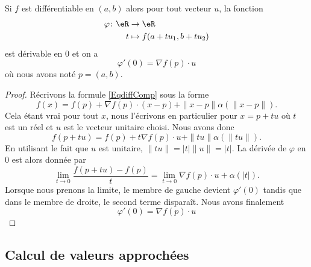 \begin{proposition}
    Si $f$ est différentiable en $(a,b)$ alors pour tout vecteur \( u\), la fonction
    \begin{equation}
        \begin{aligned}
            \varphi\colon \eR&\to \eR \\
            t&\mapsto   f(a+tu_1,b+tu_2)
        \end{aligned}
    \end{equation}
    est dérivable en $0$ et on a
    \begin{equation}
        \varphi'(0)=\nabla f(p)\cdot u
    \end{equation}
    où nous avons noté $p=(a,b)$.
\end{proposition}

\begin{proof}
    Récrivons la formule \eqref{EqdiffComp} sous la forme
    \begin{equation}
        f(x)=f(p)+\nabla f(p)\cdot (x-p)+\| x-p \|\alpha(\| x-p \|).
    \end{equation}
    Cela étant vrai pour tout $x$, nous l'écrivons en particulier pour $x=p+tu$ où $t$ est un réel et $u$ est le vecteur unitaire choisi. Nous avons donc
    \begin{equation}
        f(p+tu)=f(p)+t\nabla f(p)\cdot u+\| tu \|\alpha(\| tu \|).
    \end{equation}
    En utilisant le fait que $u$ est unitaire, $\| tu \|=| t |\| u \|=| t |$. La dérivée de $\varphi$ en $0$ est alors donnée par
    \begin{equation}
        \lim_{t\to 0} \frac{ f(p+tu)-f(p) }{ t }=\lim_{t\to 0} \nabla f(p)\cdot u+\alpha(| t |).
    \end{equation}
    Lorsque nous prenons la limite, le membre de gauche devient $\varphi'(0)$ tandis que dans le membre de droite, le second terme disparaît. Nous avons finalement
    \begin{equation}
        \varphi'(0)=\nabla f(p)\cdot u
    \end{equation}
\end{proof}

\subsection{Calcul de valeurs approchées}

